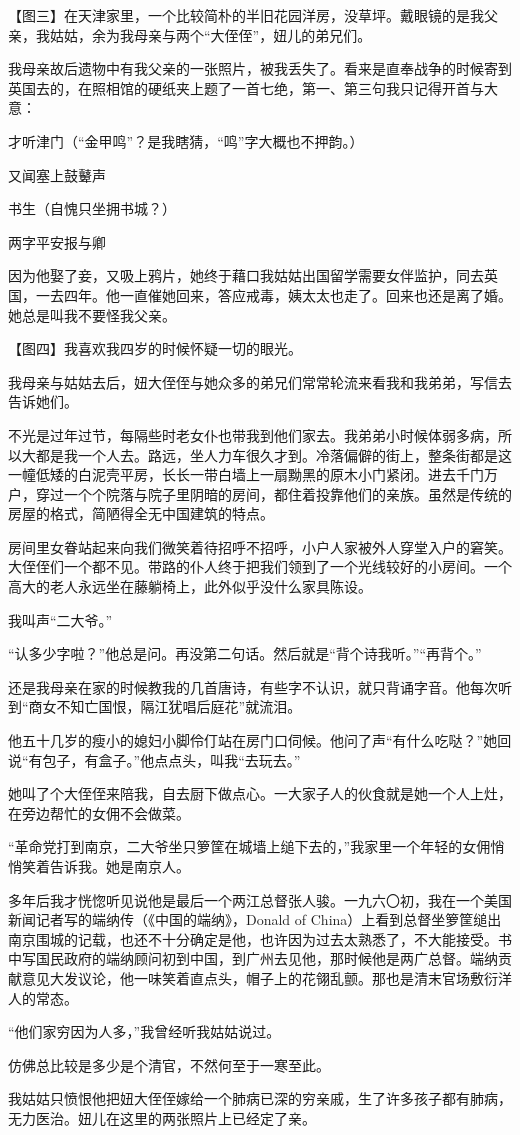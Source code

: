 \par 【图三】在天津家里，一个比较简朴的半旧花园洋房，没草坪。戴眼镜的是我父亲，我姑姑，余为我母亲与两个“大侄侄”，妞儿的弟兄们。
\par 我母亲故后遗物中有我父亲的一张照片，被我丢失了。看来是直奉战争的时候寄到英国去的，在照相馆的硬纸夹上题了一首七绝，第一、第三句我只记得开首与大意：
\par 才听津门（“金甲鸣”？是我瞎猜，“鸣”字大概也不押韵。）
\par 又闻塞上鼓鼙声
\par 书生（自愧只坐拥书城？）
\par 两字平安报与卿
\par 因为他娶了妾，又吸上鸦片，她终于藉口我姑姑出国留学需要女伴监护，同去英国，一去四年。他一直催她回来，答应戒毒，姨太太也走了。回来也还是离了婚。她总是叫我不要怪我父亲。


\par 【图四】我喜欢我四岁的时候怀疑一切的眼光。
\par 我母亲与姑姑去后，妞大侄侄与她众多的弟兄们常常轮流来看我和我弟弟，写信去告诉她们。
\par 不光是过年过节，每隔些时老女仆也带我到他们家去。我弟弟小时候体弱多病，所以大都是我一个人去。路远，坐人力车很久才到。冷落偏僻的街上，整条街都是这一幢低矮的白泥壳平房，长长一带白墙上一扇黝黑的原木小门紧闭。进去千门万户，穿过一个个院落与院子里阴暗的房间，都住着投靠他们的亲族。虽然是传统的房屋的格式，简陋得全无中国建筑的特点。
\par 房间里女眷站起来向我们微笑着待招呼不招呼，小户人家被外人穿堂入户的窘笑。大侄侄们一个都不见。带路的仆人终于把我们领到了一个光线较好的小房间。一个高大的老人永远坐在藤躺椅上，此外似乎没什么家具陈设。
\par 我叫声“二大爷。”
\par “认多少字啦？”他总是问。再没第二句话。然后就是“背个诗我听。”“再背个。”
\par 还是我母亲在家的时候教我的几首唐诗，有些字不认识，就只背诵字音。他每次听到“商女不知亡国恨，隔江犹唱后庭花”就流泪。
\par 他五十几岁的瘦小的媳妇小脚伶仃站在房门口伺候。他问了声“有什么吃哒？”她回说“有包子，有盒子。”他点点头，叫我“去玩去。”
\par 她叫了个大侄侄来陪我，自去厨下做点心。一大家子人的伙食就是她一个人上灶，在旁边帮忙的女佣不会做菜。
\par “革命党打到南京，二大爷坐只箩筐在城墙上缒下去的，”我家里一个年轻的女佣悄悄笑着告诉我。她是南京人。
\par 多年后我才恍惚听见说他是最后一个两江总督张人骏。一九六〇初，我在一个美国新闻记者写的端纳传（《中国的端纳》，Donald of China）上看到总督坐箩筐缒出南京围城的记载，也还不十分确定是他，也许因为过去太熟悉了，不大能接受。书中写国民政府的端纳顾问初到中国，到广州去见他，那时候他是两广总督。端纳贡献意见大发议论，他一味笑着直点头，帽子上的花翎乱颤。那也是清末官场敷衍洋人的常态。
\par “他们家穷因为人多，”我曾经听我姑姑说过。
\par 仿佛总比较是多少是个清官，不然何至于一寒至此。
\par 我姑姑只愤恨他把妞大侄侄嫁给一个肺病已深的穷亲戚，生了许多孩子都有肺病，无力医治。妞儿在这里的两张照片上已经定了亲。


